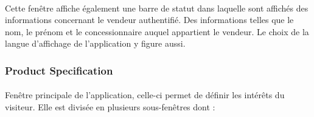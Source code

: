 \documentclass[12pt]{report}
\begin{document}
\paragraph{}
Cette fenêtre affiche également une barre de statut dans laquelle sont affichés des informations concernant le vendeur authentifié. Des informations telles que le nom, le prénom et le concessionnaire auquel appartient le vendeur. 
Le choix de la langue d'affichage de l'application y figure aussi.

\subsubsection*{Product Specification}
\paragraph{}
Fenêtre principale de l'application, celle-ci permet de définir les intérêts du visiteur. Elle est divisée en plusieurs sous-fenêtres dont : 
\end{document}
